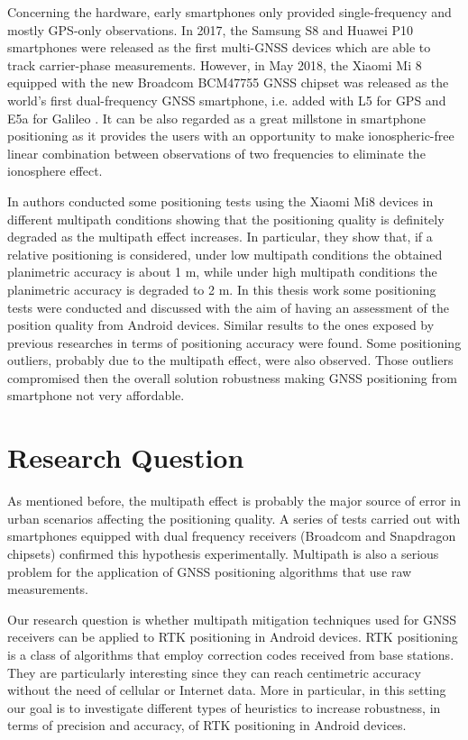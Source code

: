  Concerning the hardware, early smartphones only provided single-frequency and mostly GPS-only observations. In 2017, the Samsung S8 and Huawei P10 smartphones were released as the first multi-GNSS devices which are able to track carrier-phase measurements. However, in May 2018, the Xiaomi Mi 8 equipped with the new Broadcom BCM47755 GNSS chipset was released as the world’s first dual-frequency GNSS smartphone, i.e. added with L5 for GPS and E5a for Galileo \cite{Zangenehnejad:2021}. It can be also regarded as a great millstone in smartphone positioning as it provides the users with an opportunity to make ionospheric-free linear combination between observations of two frequencies to eliminate the ionosphere effect.

 In \cite{Robustelli:2019} authors conducted some positioning tests using the Xiaomi Mi8 devices in different multipath conditions showing that the positioning quality is definitely degraded as the multipath effect increases. In particular, they show that, if a relative positioning is considered, under low multipath conditions the obtained planimetric accuracy is about 1 m, while under high multipath conditions the planimetric accuracy is degraded to 2 m. In this thesis work some positioning tests were conducted and discussed with the aim of having an assessment of the position quality from Android devices. Similar results to the ones exposed by previous researches in terms of positioning accuracy were found. Some positioning outliers, probably due to the multipath effect, were also observed. Those outliers compromised then the overall solution robustness making GNSS positioning from smartphone not very affordable.

\section{Research Question}
%
As mentioned before, the multipath effect is probably the major source of error in urban scenarios affecting the positioning quality.
A series of tests carried out with smartphones equipped with dual frequency receivers (Broadcom and Snapdragon chipsets) 
confirmed this hypothesis experimentally. 
Multipath is also a serious problem for the application 
of GNSS positioning algorithms that use raw measurements.

Our research question is whether multipath mitigation techniques used for GNSS receivers can be applied to RTK positioning in Android devices. RTK positioning is a class of algorithms that employ correction codes received from base stations.
They are particularly interesting since they can reach centimetric accuracy without the need of cellular or Internet data.
More in particular, in this setting our goal is to investigate different types of heuristics to increase robustness, in terms of precision and accuracy, of RTK positioning in Android devices.
%

